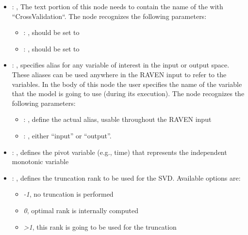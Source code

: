 \begin{itemize}
    \item {}: , 
      The text portion of this node needs to contain the name of the  with
               ``CrossValidation``.
      The  node recognizes the following parameters:
        \begin{itemize}
          \item {}: , 
            should be set to 
          \item {}: , 
            should be set to 
      \end{itemize}

    \item {}: , 
      specifies alias for         any variable of interest in the input or output space. These
      aliases can be used anywhere in the RAVEN input to         refer to the variables. In the body
      of this node the user specifies the name of the variable that the model is going to use
      (during its execution).
      The  node recognizes the following parameters:
        \begin{itemize}
          \item {}: , 
            define the actual alias, usable throughout the RAVEN input
          \item {}: , 
            either ``input'' or ``output''.
      \end{itemize}

    \item {}: , 
      defines the pivot variable (e.g., time) that represents the
      independent monotonic variable

    \item {}: , 
      defines the truncation rank to be used for the SVD.
      Available options are:                                                  \begin{itemize}
      \item \textit{-1}, no truncation is performed
      \item \textit{0}, optimal rank is internally computed
      \item \textit{>1}, this rank is going to be used for the truncation
      \end{itemize}


\end{itemize}
